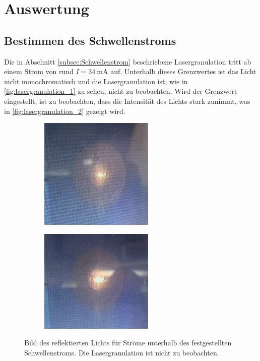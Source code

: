 \section{Auswertung}
\label{sec:Auswertung}

\subsection{Bestimmen des Schwellenstroms}
Die in Abschnitt \ref{subsec:Schwellenstrom} beschriebene Lasergranulation tritt ab einem Strom von rund $I=\qty{34}{\milli\ampere}$ auf. Unterhalb dieses Grenzwertes ist das Licht
nicht monochromatisch und die Lasergranulation ist, wie in \autoref{fig:lasergranulation_1} zu sehen, nicht zu beobachten. Wird der Grenzwert eingestellt, ist zu beobachten,
dass die Intensität des Lichts stark zunimmt, was in \autoref{fig:lasergranulation_2} gezeigt wird.

  \begin{figure}
    \begin{subfigure}[c]{0.5\textwidth}
        \centering
        \includegraphics[width=0.6\textwidth]{content/pics/30mA.png}
    
    \end{subfigure}
    \begin{subfigure}[c]{0.5\textwidth}
        \centering
        \includegraphics[width=0.6\textwidth]{content/pics/33,5mA.png}
    \end{subfigure}
    \caption{Bild des reflektierten Lichts für Ströme unterhalb des festgestellten Schwellenstroms. Die Lasergranulation ist nicht zu beobachten.}
    \label{fig:lasergranulation_1}
\end{figure}

